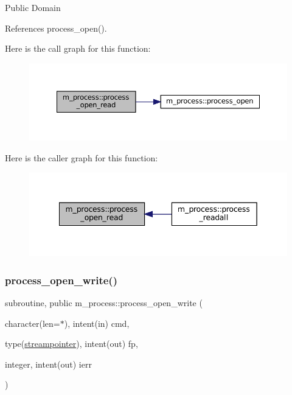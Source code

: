 Public Domain 

References process\+\_\+open().

Here is the call graph for this function\+:\nopagebreak
\begin{figure}[H]
\begin{center}
\leavevmode
\includegraphics[width=350pt]{namespacem__process_aaaf4d1926258a4cec7da7fc61c38c79d_cgraph}
\end{center}
\end{figure}
Here is the caller graph for this function\+:\nopagebreak
\begin{figure}[H]
\begin{center}
\leavevmode
\includegraphics[width=342pt]{namespacem__process_aaaf4d1926258a4cec7da7fc61c38c79d_icgraph}
\end{center}
\end{figure}
\mbox{\label{namespacem__process_aa6ed1404ab3472f5068ed15a7a01defc}} 
\subsubsection{\texorpdfstring{process\+\_\+open\+\_\+write()}{process\_open\_write()}}
{\footnotesize\ttfamily subroutine, public m\+\_\+process\+::process\+\_\+open\+\_\+write (\begin{DoxyParamCaption}\item[{character(len=$\ast$), intent(in)}]{cmd,  }\item[{type(\mbox{\hyperlink{structm__process_1_1streampointer}{streampointer}}), intent(out)}]{fp,  }\item[{integer, intent(out)}]{ierr }\end{DoxyParamCaption})}



